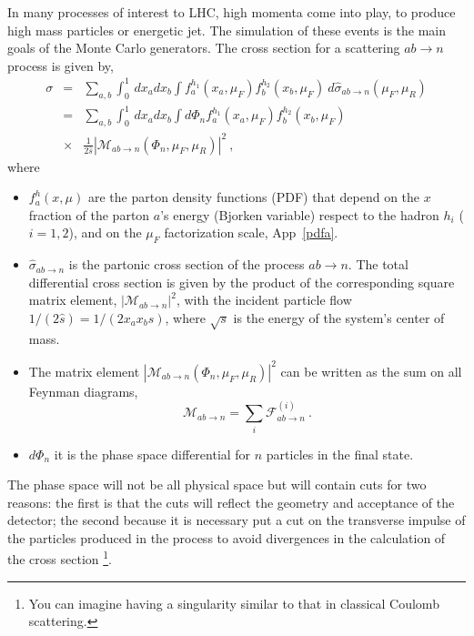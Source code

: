 In many processes of interest to LHC, high momenta come into play, to produce high mass particles or  energetic jet. The simulation of these events is the main goals of the Monte Carlo generators.
The cross section for a scattering $ ab \rightarrow n $ process is given \cite{Buckley:2011ms} by,
\begin{eqnarray}
 \sigma & = & \sum_{a,b}  \int_{0}^{1} \, dx_{a} dx_b \int f_{a}^{h_1} (x_a , \mu_F) f_{b}^{h_2} (x_b , \mu_F) \: d \hat{\sigma}_{ab \rightarrow n}(\mu_F , \mu_R)  \nonumber \\
& = & \sum_{a,b}  \int_{0}^{1} \, dx_{a} dx_b \int d \Phi_n  f_{a}^{h_1} (x_a , \mu_F) f_{b}^{h_2} (x_b , \mu_F) \nonumber \\
 & \times& \frac{1}{2\hat{s}} 
 | \mathcal{M}_{ab \rightarrow n} 
(\Phi_n , \mu_F , \mu_R)|^2  \: \mbox{,} \end{eqnarray}
where
\begin{itemize}
\item $f_{a}^{h} (x , \mu)$ are the parton density functions (PDF) that depend on the $x$ fraction of the parton $a$'s energy (Bjorken variable) respect to the 
hadron $h_i$ ($i=1,2$), and on the $\mu_F $ factorization scale, App~\ref{pdfa}.
\item $\hat {\sigma}_ {ab\rightarrow n} $ is the partonic cross section of the process $ ab \rightarrow n $.
The total differential cross section is given by the product of the corresponding square matrix element, $ | \mathcal {M}_{ab \rightarrow n} |^2 $, 
with  the incident particle flow $ 1 / (2 \hat{s}) = 1 / (2 x_a x_b s) $, where $ \sqrt{s} $ is the energy of the system's center of mass.
\item The matrix element $| \mathcal{M}_{ab \rightarrow n}  (\Phi_n , \mu_F , \mu_R) |^2 $  can be written as the sum on all Feynman diagrams,
\begin{equation}
\mathcal{M}_{ab \rightarrow n}= \sum_{i} \mathcal{F}_{ab \rightarrow n}^{(i)} \: \mbox{.} \end{equation}
\item $d\Phi_n$ it is the phase space differential for $ n $ particles in the final state.
\end{itemize}
The phase space will not be all physical space  but will contain cuts for two reasons: the first is that  the cuts will reflect the geometry and acceptance of the detector; the second because it is necessary put a cut on the transverse impulse of the particles produced in the process to avoid divergences in the calculation of the cross section \footnote {You can imagine having a singularity similar to that  in classical Coulomb scattering.}.

